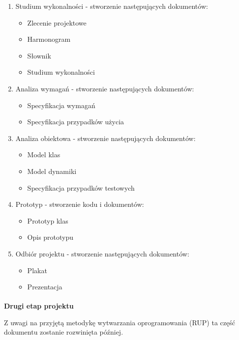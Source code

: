 \documentclass[a4paper,10pt]{article}
\begin{document}
\begin{enumerate}
 \item Studium wykonalności - stworzenie następujących dokumentów:
	\begin{itemize}
 		\item  Zlecenie projektowe
		\item  Harmonogram
		\item Słownik
		\item Studium wykonalności
	\end{itemize}
 
\item Analiza wymagań - stworzenie następujących dokumentów:
	\begin{itemize}
 		\item Specyfikacja wymagań
		\item Specyfikacja przypadków użycia
	\end{itemize}


\item Analiza obiektowa - stworzenie następujących dokumentów:
	\begin{itemize}
 		\item Model klas
		\item Model dynamiki
		\item Specyfikacja przypadków testowych
	\end{itemize}

\item Prototyp - stworzenie kodu i dokumentów:
	\begin{itemize}
 		\item Prototyp klas
		\item Opis prototypu  
	\end{itemize}

\item Odbiór projektu - stworzenie następujących dokumentów:
	\begin{itemize}
 		\item Plakat
		\item Prezentacja
	\end{itemize}

\end{enumerate}

\paragraph{} \textbf{Drugi etap projektu}

Z uwagi na przyjętą metodykę wytwarzania oprogramowania (RUP) ta część dokumentu zostanie rozwinięta później.

%
\end{document}
